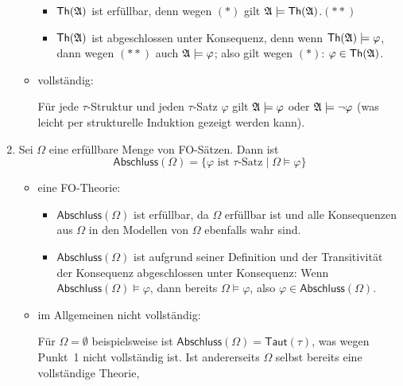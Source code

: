 \documentclass[fontsize=11pt, twoside=false, numbers=autoenddot]{scrbook}
\begin{document}
\begin{enumerate}
\begin{itemize}
\begin{itemize}
          \item
            $\textsf{Th}(\mathfrak{A})$ ist erfüllbar, denn wegen $(*)$ gilt $\mathfrak{A} \models \textsf{Th}(\mathfrak{A})$.\quad $(**)$
          \item
            $\textsf{Th}(\mathfrak{A})$ ist abgeschlossen unter Konsequenz, denn
            wenn $\textsf{Th}(\mathfrak{A}) \models \varphi$,
            dann wegen $(**)$ auch $\mathfrak{A} \models \varphi$;
            also gilt wegen $(*)$: $\varphi \in \textsf{Th}(\mathfrak{A})$.
        \end{itemize}
        \par\smallskip
      \item
        vollständig:
        \par
        Für jede $\tau$-Struktur \Amf und jeden $\tau$-Satz $\varphi$ gilt $\mathfrak{A} \models \varphi$ oder $\mathfrak{A} \models \lnot\varphi$
        (was leicht per strukturelle Induktion gezeigt werden kann).
    \end{itemize}
    \par\smallskip
  \item
    Sei $\Omega$ eine erf\"ullbare Menge von FO-S\"atzen.
    Dann ist
    \[
      \textsf{Abschluss}(\Omega) = \{ \varphi \text{ ist $\tau$-Satz} \mid \Omega \models \varphi \}
    \]
    \begin{itemize}
      \item
        eine FO-Theorie:
        \par
        \begin{itemize}
          \item
            $\textsf{Abschluss}(\Omega)$ ist erfüllbar, da $\Omega$ erfüllbar ist
            und alle Konsequenzen aus $\Omega$ in den Modellen von $\Omega$ ebenfalls wahr sind.
          \item
            $\textsf{Abschluss}(\Omega)$ ist aufgrund seiner Definition und der Transitivität der Konsequenz abgeschlossen unter Konsequenz:
            Wenn $\textsf{Abschluss}(\Omega) \models \varphi$, dann bereits $\Omega \models \varphi$,
            also $\varphi \in \textsf{Abschluss}(\Omega)$.
        \end{itemize}
        \par\smallskip
      \item
        im Allgemeinen nicht vollständig:
        \par
        Für $\Omega = \emptyset$ beispielsweise ist $\textsf{Abschluss}(\Omega) = \textsf{Taut}(\tau)$,
        was wegen Punkt~1 nicht vollständig ist.
        Ist andererseits $\Omega$ selbst bereits eine vollständige Theorie,

\end{itemize}
\end{enumerate}
\end{document}
